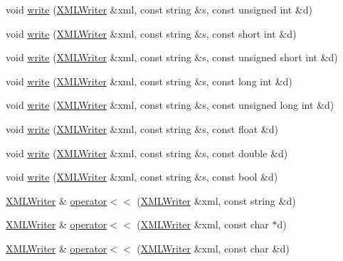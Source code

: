 \begin{DoxyCompactItemize}
\item 
void \mbox{\hyperlink{namespaceADATXML_ae74cc956dd05ca6f00fc514974a9e910}{write}} (\mbox{\hyperlink{classADATXML_1_1XMLWriter}{X\+M\+L\+Writer}} \&xml, const string \&s, const unsigned int \&d)
\item 
void \mbox{\hyperlink{namespaceADATXML_a4c9ae91c2edf209b107c441d5b61b737}{write}} (\mbox{\hyperlink{classADATXML_1_1XMLWriter}{X\+M\+L\+Writer}} \&xml, const string \&s, const short int \&d)
\item 
void \mbox{\hyperlink{namespaceADATXML_aec4f1998ac8b46117a53c900880970b5}{write}} (\mbox{\hyperlink{classADATXML_1_1XMLWriter}{X\+M\+L\+Writer}} \&xml, const string \&s, const unsigned short int \&d)
\item 
void \mbox{\hyperlink{namespaceADATXML_ad3215354aef6061e9896556e834f89bd}{write}} (\mbox{\hyperlink{classADATXML_1_1XMLWriter}{X\+M\+L\+Writer}} \&xml, const string \&s, const long int \&d)
\item 
void \mbox{\hyperlink{namespaceADATXML_a578f900bd955ac5e0634cab05b971100}{write}} (\mbox{\hyperlink{classADATXML_1_1XMLWriter}{X\+M\+L\+Writer}} \&xml, const string \&s, const unsigned long int \&d)
\item 
void \mbox{\hyperlink{namespaceADATXML_a035a5eef9aec1745474937a355e7813b}{write}} (\mbox{\hyperlink{classADATXML_1_1XMLWriter}{X\+M\+L\+Writer}} \&xml, const string \&s, const float \&d)
\item 
void \mbox{\hyperlink{namespaceADATXML_a858880833c586f87f16f2f3022243c16}{write}} (\mbox{\hyperlink{classADATXML_1_1XMLWriter}{X\+M\+L\+Writer}} \&xml, const string \&s, const double \&d)
\item 
void \mbox{\hyperlink{namespaceADATXML_af41b23f17b1b37465f4c3ca3a115e87a}{write}} (\mbox{\hyperlink{classADATXML_1_1XMLWriter}{X\+M\+L\+Writer}} \&xml, const string \&s, const bool \&d)
\item 
\mbox{\hyperlink{classADATXML_1_1XMLWriter}{X\+M\+L\+Writer}} \& \mbox{\hyperlink{namespaceADATXML_a83bf96b9b273ac7b48f1f7eef49b5390}{operator$<$$<$}} (\mbox{\hyperlink{classADATXML_1_1XMLWriter}{X\+M\+L\+Writer}} \&xml, const string \&d)
\item 
\mbox{\hyperlink{classADATXML_1_1XMLWriter}{X\+M\+L\+Writer}} \& \mbox{\hyperlink{group__io_ga1e77b0f38cdffd40d5f5d947a4527bb4}{operator$<$$<$}} (\mbox{\hyperlink{classADATXML_1_1XMLWriter}{X\+M\+L\+Writer}} \&xml, const char $\ast$d)
\item 
\mbox{\hyperlink{classADATXML_1_1XMLWriter}{X\+M\+L\+Writer}} \& \mbox{\hyperlink{group__io_gaaf7119c0afc1e8701f12daa5d349ae00}{operator$<$$<$}} (\mbox{\hyperlink{classADATXML_1_1XMLWriter}{X\+M\+L\+Writer}} \&xml, const char \&d)

\end{DoxyCompactItemize}
